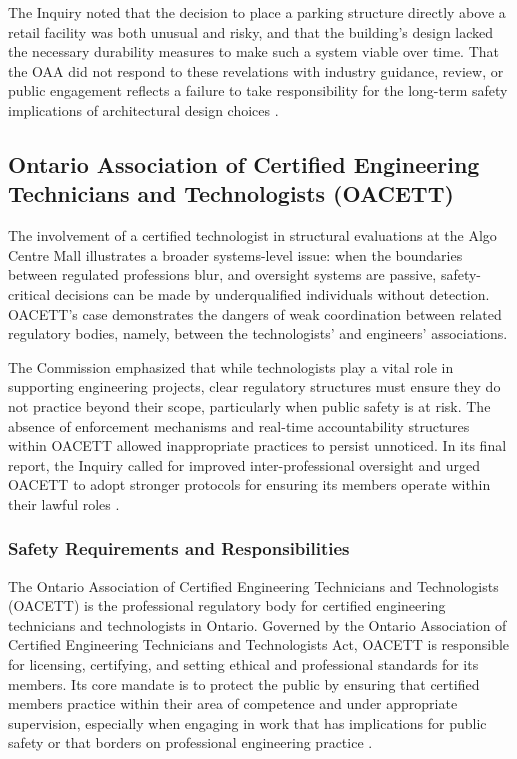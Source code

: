 \documentclass[12pt]{article}
\begin{document}
The Inquiry noted that the decision to place a parking structure directly above a retail facility was both unusual and risky, and that the building's design lacked the necessary durability measures to make such a system viable over time. That the OAA did not respond to these revelations with industry guidance, review, or public engagement reflects a failure to take responsibility for the long-term safety implications of architectural design choices \cite[p396-398]{AlgoLakeReport1}.

\subsection{Ontario Association of Certified Engineering Technicians and Technologists (OACETT)}

The involvement of a certified technologist in structural evaluations at the Algo Centre Mall illustrates a broader systems-level issue: when the boundaries between regulated professions blur, and oversight systems are passive, safety-critical decisions can be made by underqualified individuals without detection. OACETT's case demonstrates the dangers of weak coordination between related regulatory bodies, namely, between the technologists' and engineers' associations.

The Commission emphasized that while technologists play a vital role in supporting engineering projects, clear regulatory structures must ensure they do not practice beyond their scope, particularly when public safety is at risk. The absence of enforcement mechanisms and real-time accountability structures within OACETT allowed inappropriate practices to persist unnoticed. In its final report, the Inquiry called for improved inter-professional oversight and urged OACETT to adopt stronger protocols for ensuring its members operate within their lawful roles \cite[p398-400]{AlgoLakeReport1}.

\subsubsection*{Safety Requirements and Responsibilities}

The Ontario Association of Certified Engineering Technicians and Technologists (OACETT) is the professional regulatory body for certified engineering technicians and technologists in Ontario. Governed by the Ontario Association of Certified Engineering Technicians and Technologists Act, OACETT is responsible for licensing, certifying, and setting ethical and professional standards for its members. Its core mandate is to protect the public by ensuring that certified members practice within their area of competence and under appropriate supervision, especially when engaging in work that has implications for public safety or that borders on professional engineering practice \cite[p398-400]{AlgoLakeReport1}.
\end{document}
